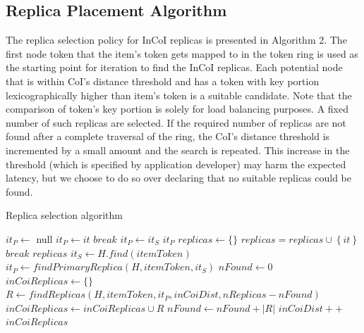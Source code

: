 \subsection{Replica Placement Algorithm}
The replica selection policy for InCoI replicas is presented in Algorithm 2. The first node token that the item's token gets mapped to in the token ring is used as the starting point for iteration to find the InCoI replicas. Each potential node that is within CoI's distance threshold  and has a token with key portion lexicographically higher than item's token is a suitable candidate. Note that the comparison of token's key portion is solely for load balancing purposes. A fixed number of such replicas are selected. If the required number of replicas are not found after a complete traversal of the ring, the CoI's distance threshold is incremented by a small amount and the search is repeated. This increase in the threshold (which is specified by application developer) may harm the expected latency, but we choose to do so over declaring that no suitable replicas could be found.
\begin{algorithm}
\caption{Replica selection algorithm}\label{incoireplicaselection}
\begin{algorithmic}[1]
\State $it_P \gets $ null
		\State $it_P \gets it$
		\State $break$
	\EndIf
\EndFor
{}
	\State $it_P \gets it_S$
\EndIf
\Return $it_P$
\EndProcedure
{}
\State $replicas \gets \{\}$
		\State $replicas = replicas \cup \left\{ {it} \right\}$
	\EndIf
		\State $break$
	\EndIf
\EndFor
\Return $replicas$
\EndProcedure
{}
\State $it_S \gets H.find(itemToken)$
\State $it_P \gets findPrimaryReplica (H, itemToken, it_S)$
\State $nFound \gets 0$
\State $inCoiReplicas \gets \{\}$
	\State $R \gets findReplicas(H, itemToken, it_P, inCoiDist, nReplicas-nFound)$
	\State $inCoiReplicas \gets inCoiReplicas \cup R$
	\State $nFound \gets nFound + \left\vert{R}\right\vert$
	\State $inCoiDist++$
\EndWhile
\Return $inCoiReplicas$
\EndProcedure
\end{algorithmic}
\end{algorithm}

